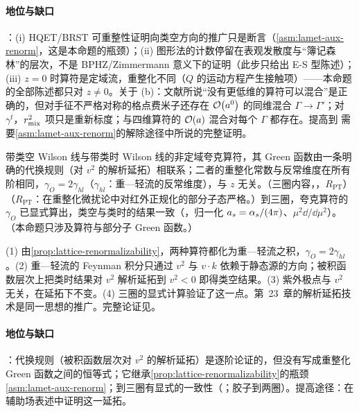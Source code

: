 \paragraph{地位与缺口}
\tagA：(i) HQET/BRST 可重整性证明向类空方向的推广只是断言（\cref{asm:lamet-aux-renorm}，这是本命题的瓶颈）；(ii) 图形法的计数停留在表观发散度与“簿记森林”的层次，不是 BPHZ/Zimmermann 意义下的证明（此步只给出 E-S 型陈述）；(iii) $z=0$ 时算符是定域流，重整化不同（$Q$ 的运动方程产生接触项）——本命题的全部陈述都只对 $z\neq0$。关于 (b)：文献\cite{Ji:2017oey}所说“没有更低维的算符可以混合”是正确的，但对手征不严格对称的格点费米子还存在 $\mathcal{O}\!\left(a^0\right)$ 的同维混合 $\Gamma\to\Gamma'$\cite{Green:2017xeu,Constantinou:2017sej,Chen:2017mie}；对 $\gamma^t$，$r_{\rm mix}^2$ 项只是重新标度；与四维算符的 $\mathcal{O}\!\left(a\right)$ 混合对每个 $\Gamma$ 都存在。提高到 \tagR 需要\cref{asm:lamet-aux-renorm}的解除途径中所说的完整证明。

\begin{proposition}\label{prop:lamet-ad-spacelike}
带类空 Wilson 线与带类时 Wilson 线的非定域夸克算符，其 Green 函数由一条明确的代换规则（对 $v^2$ 的解析延拓）相联系；二者的重整化常数与反常维度在所有阶相同，$\gamma_O=2\gamma_{hl}$（$\gamma_{hl}$：重—轻流的反常维度），与 $z$ 无关。（三圈内容，\tagR，$R_{\mathrm{PT}}$）（$R_{\mathrm{PT}}$：在重整化微扰论中对红外正规化的部分子态严格。）到三圈，夸克算符的 $\gamma_O$ 已显式算出，类空与类时的结果一致（\cite[附录~A]{Braun:2020ymy}，归一化 $a_s=\alpha_s/(4\pi)$、$\mu^2\dd/\dd\mu^2$）。
（本命题只涉及算符与部分子 Green 函数。）
\end{proposition}

\begin{proofsketch}
(1) 由\cref{prop:lattice-renormalizability}，两种算符都化为重—轻流之积，$\gamma_O=2\gamma_{hl}$。(2) 重—轻流的 Feynman 积分只通过 $v^2$ 与 $v\cdot k$ 依赖于静态源的方向；被积函数层次上把类时结果对 $v^2$ 解析延拓到 $v^2<0$ 即得类空结果\cite{Braun:2020ymy}。(3) 紫外极点与 $v^2$ 无关，在延拓下不变。(4) 三圈的显式计算验证了这一点。第~23~章的解析延拓技术是同一思想的推广。完整论证见\cite{Braun:2020ymy}。
\end{proofsketch}

\paragraph{地位与缺口}
\tagA：代换规则（被积函数层次对 $v^2$ 的解析延拓）是逐阶论证的，但没有写成重整化 Green 函数之间的恒等式；它继承\cref{prop:lattice-renormalizability}的瓶颈\cref{asm:lamet-aux-renorm}；到三圈有显式的一致性（\cite[附录~A]{Braun:2020ymy}；胶子到两圈）。提高途径：在辅助场表述中证明这一延拓。

